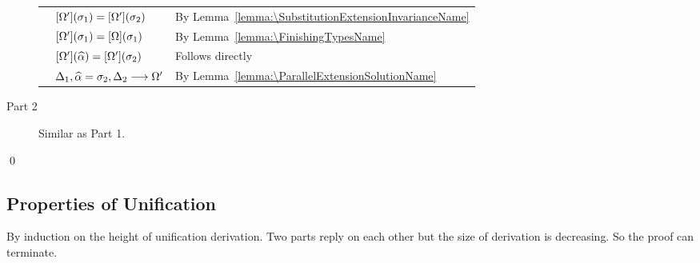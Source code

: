 \begin{description}
\begin{longtable}[l]{lll}
    & $[\Omega'](\sigma_1) = [\Omega'](\sigma_2)$
    & By Lemma~\ref{lemma:\SubstitutionExtensionInvarianceName} \\
    & $[\Omega'](\sigma_1) = [\Omega](\sigma_1)$
    & By Lemma~\ref{lemma:\FinishingTypesName} \\
    & $[\Omega'](\widehat{\alpha}) = [\Omega'](\sigma_2)$
    & Follows directly \\
    & $\Delta_1, \widehat{\alpha} = \sigma_2, \Delta_2 \longrightarrow \Omega'$
    & By Lemma~\ref{lemma:\ParallelExtensionSolutionName}
  \end{longtable}
\item [Part 2]
  Similar as Part 1.
\end{description}
\qed


\subsection{Properties of Unification}

\begin{lemma}[\UnificationExtensionName]\leavevmode
  \label{lemma:\UnificationExtensionName}
  \UnificationExtensionBody
\end{lemma}
\proof

By induction on the height of unification derivation.
Two parts reply on each
other but the size of derivation is decreasing.
So the proof can terminate.

